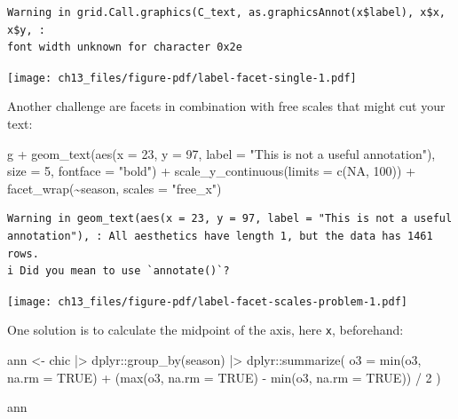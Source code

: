 \documentclass[
  letterpaper,
  DIV=11,
  numbers=noendperiod]{scrreprt}
\newenvironment{Shaded}{\begin{snugshade}}{\end{snugshade}}
\newcommand{\AttributeTok}[1]{\textcolor[rgb]{0.40,0.45,0.13}{#1}}
\newcommand{\ConstantTok}[1]{\textcolor[rgb]{0.56,0.35,0.01}{#1}}
\newcommand{\DecValTok}[1]{\textcolor[rgb]{0.68,0.00,0.00}{#1}}
\newcommand{\FunctionTok}[1]{\textcolor[rgb]{0.28,0.35,0.67}{#1}}
\newcommand{\NormalTok}[1]{\textcolor[rgb]{0.00,0.23,0.31}{#1}}
\newcommand{\OtherTok}[1]{\textcolor[rgb]{0.00,0.23,0.31}{#1}}
\newcommand{\SpecialCharTok}[1]{\textcolor[rgb]{0.37,0.37,0.37}{#1}}
\newcommand{\StringTok}[1]{\textcolor[rgb]{0.13,0.47,0.30}{#1}}
\begin{document}
\begin{verbatim}
Warning in grid.Call.graphics(C_text, as.graphicsAnnot(x$label), x$x, x$y, :
font width unknown for character 0x2e
\end{verbatim}

\texttt{[image: ch13\_files/figure-pdf/label-facet-single-1.pdf]}

Another challenge are facets in combination with free scales that might
cut your text:

\begin{Shaded}
\begin{Highlighting}[]
\NormalTok{g }\SpecialCharTok{+}
  \FunctionTok{geom\_text}\NormalTok{(}\FunctionTok{aes}\NormalTok{(}\AttributeTok{x =} \DecValTok{23}\NormalTok{, }\AttributeTok{y =} \DecValTok{97}\NormalTok{,}
                \AttributeTok{label =} \StringTok{"This is not a useful annotation"}\NormalTok{),}
            \AttributeTok{size =} \DecValTok{5}\NormalTok{, }\AttributeTok{fontface =} \StringTok{"bold"}\NormalTok{) }\SpecialCharTok{+}
  \FunctionTok{scale\_y\_continuous}\NormalTok{(}\AttributeTok{limits =} \FunctionTok{c}\NormalTok{(}\ConstantTok{NA}\NormalTok{, }\DecValTok{100}\NormalTok{)) }\SpecialCharTok{+}
  \FunctionTok{facet\_wrap}\NormalTok{(}\SpecialCharTok{\textasciitilde{}}\NormalTok{season, }\AttributeTok{scales =} \StringTok{"free\_x"}\NormalTok{)}
\end{Highlighting}
\end{Shaded}

\begin{verbatim}
Warning in geom_text(aes(x = 23, y = 97, label = "This is not a useful annotation"), : All aesthetics have length 1, but the data has 1461 rows.
i Did you mean to use `annotate()`?
\end{verbatim}

\texttt{[image: ch13\_files/figure-pdf/label-facet-scales-problem-1.pdf]}

One solution is to calculate the midpoint of the axis, here \texttt{x},
beforehand:

\begin{Shaded}
\begin{Highlighting}[]
\NormalTok{ann }\OtherTok{\textless{}{-}}
\NormalTok{  chic }\SpecialCharTok{|\textgreater{}}
\NormalTok{  dplyr}\SpecialCharTok{::}\FunctionTok{group\_by}\NormalTok{(season) }\SpecialCharTok{|\textgreater{}}
\NormalTok{  dplyr}\SpecialCharTok{::}\FunctionTok{summarize}\NormalTok{(}
    \AttributeTok{o3 =} \FunctionTok{min}\NormalTok{(o3, }\AttributeTok{na.rm =} \ConstantTok{TRUE}\NormalTok{) }\SpecialCharTok{+}
\NormalTok{          (}\FunctionTok{max}\NormalTok{(o3, }\AttributeTok{na.rm =} \ConstantTok{TRUE}\NormalTok{) }\SpecialCharTok{{-}} \FunctionTok{min}\NormalTok{(o3, }\AttributeTok{na.rm =} \ConstantTok{TRUE}\NormalTok{)) }\SpecialCharTok{/} \DecValTok{2}
\NormalTok{)}

\NormalTok{ann}
\end{Highlighting}
\end{Shaded}
\end{document}
